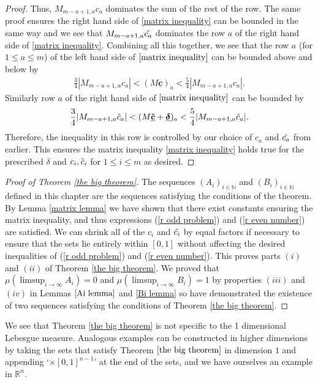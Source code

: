 \documentclass[12pt]{article}
\begin{document}
\begin{proof}
Thus, $M_{m-a+1,a}c_a$ dominates the sum of the rest of the row. The same proof ensures the right hand side of \eqref{matrix inequality} can be bounded in the same way and we see that $M_{m-a+1,a}\Tilde{c_a}$ dominates the row $a$ of the right hand side of \eqref{matrix inequality}.
Combining all this together, we see that the row $a$ (for $1 \leq a \leq m$) of the left hand side of $\eqref{matrix inequality}$ can be bounded above and below by
\begin{align*}
    \frac{3}{4} |M_{m-a+1,a}c_a| <(M \underline{\mathbf{c}})_a < \frac{5}{4} |M_{m-a+1,a}c_a|.
\end{align*}
Similarly row $a$ of the right hand side of $\eqref{matrix inequality}$ can be bounded by
\begin{align*}
    \frac{3}{4} |M_{m-a+1,a}\Tilde{c}_a| <(M \underline{\mathbf{\Tilde{c}}}+\underline{\text{\boldmath$\delta$}})_a < \frac{5}{4} |M_{m-a+1,a} \Tilde{c}_a|.
\end{align*}
Therefore, the inequality in this row is controlled by our choice of $c_a$ and $\Tilde{c_a}$ from earlier. This ensures the matrix inequality \eqref{matrix inequality} holds true for the prescribed $\delta$ and $c_i, \Tilde{c}_i$ for $1 \leq i \leq m$ as desired. \qedhere



\end{proof}

\begin{proof}[Proof of Theorem \ref{the big theorem}]
    The sequences $(A_i)_{i \in \mathbb{N}}$ and $(B_i)_{i \in \mathbb{N}}$ defined in this chapter are the sequences satisfying the conditions of the theorem. By Lemma \ref{matrix lemma} we have shown that there exist constants ensuring the matrix inequality, and thus expressions (\ref{r odd problem}) and (\ref{r even number}) are satisfied. We can shrink all of the $c_i$ and $\Tilde{c_i}$ by equal factors if necessary to ensure that the sets lie entirely within $[0,1]$ without affecting the desired inequalities of (\ref{r odd problem}) and (\ref{r even number}). This proves parts $(i)$ and $(ii)$ of Theorem \ref{the big theorem}. We proved that $\mu(\limsup_{i \rightarrow \infty} A_i)=0$ and $\mu(\limsup_{i \rightarrow \infty} B_i)=1$ by properties $(iii)$ and $(iv)$ in Lemmas $\ref{Ai lemma}$ and \ref{Bi lemma} so have demonstrated the existence of two sequences satisfying the conditions of Theorem \ref{the big theorem}.
\end{proof}


\begin{remark}
   We see that Theorem \ref{the big theorem} is not specific to the 1 dimensional Lebesgue measure. Analogous examples can be constructed in higher dimensions by taking the sets that satisfy Theorem $\ref{the big theorem}$ in dimension $1$ and appending `$\times [0,1]^{n-1}$' at the end of the sets, and we have ourselves an example in $\mathbb{R}^n$.

   
   \end{remark}
\end{document}
